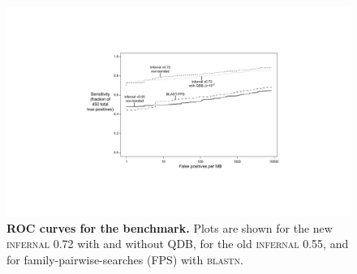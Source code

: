\begin{figure}
\begin{center}
\includegraphics[width=6.4in,angle=0]{figs/roc}
\end{center}
\caption{\textbf{ROC curves for the benchmark.}  Plots are shown for
the new \textsc{infernal} 0.72 with and without QDB, for the old
\textsc{infernal} 0.55, and for family-pairwise-searches (FPS) with \textsc{blastn}.
}
\label{fig:roc}
\end{figure}
